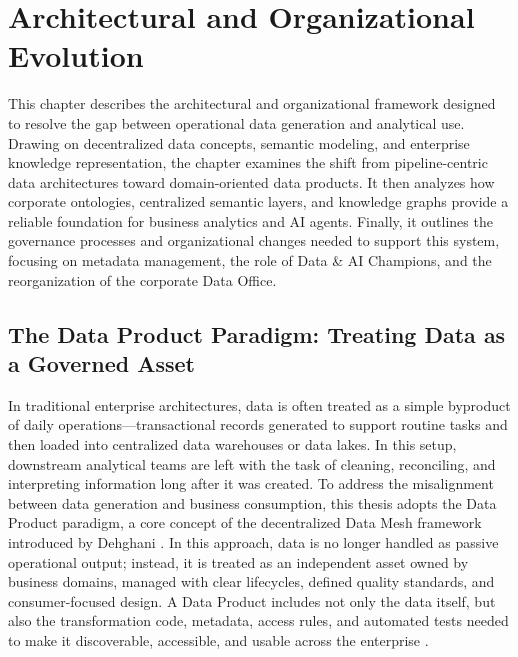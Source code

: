 \chapter{Architectural and Organizational Evolution}
\label{chap:architecture}


This chapter describes the architectural and organizational framework designed to resolve the gap between operational data generation and analytical use. 
Drawing on decentralized  data concepts, semantic modeling, and enterprise knowledge representation, the chapter examines the shift from pipeline-centric 
data architectures toward domain-oriented data products. It then analyzes how corporate ontologies, centralized semantic layers, and knowledge graphs provide 
a reliable foundation for business analytics and AI agents. 
Finally, it outlines the governance processes and organizational changes needed to support this system, focusing on metadata management, the role of Data \& AI Champions, 
and the reorganization of the corporate Data Office.


\section[The Data Product Paradigm]{The Data Product Paradigm: Treating Data as a Governed Asset}
\label{sec:data_product_paradigm}

In traditional enterprise architectures, data is often treated as a simple byproduct of daily operations---transactional records generated to support routine tasks and then 
loaded into centralized data warehouses or data lakes. In this setup, downstream analytical teams are left with the task of cleaning, reconciling, and interpreting information 
long after it was created. To address the misalignment between data generation and business consumption, this thesis adopts the Data Product paradigm, a core concept of the 
decentralized Data Mesh framework introduced by Dehghani \cite{dehghani2022data}. In this approach, data is no longer handled as passive operational output; 
instead, it is treated as an independent asset owned by business domains, managed with clear lifecycles, defined quality standards, and consumer-focused design. 
A Data Product includes not only the data itself, but also the transformation code, metadata, access rules, and automated tests needed to make it discoverable, accessible, 
and usable across the enterprise \cite{dehghani2022data}.

